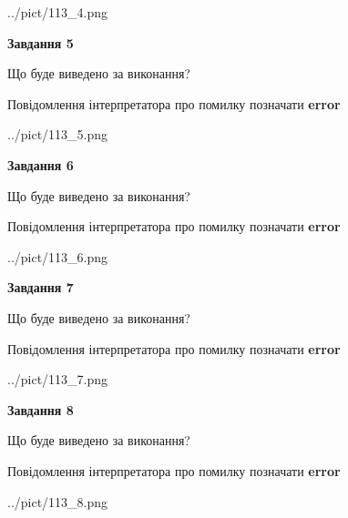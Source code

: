 \documentclass[12pt, ukrainian]{article}
\begin{document}
{\begin{center}
	{../pict/113_4.png}
\end{center}
\newpage

{\begin {center}\textbf{Завдання 5}\end {center}}\par
Що буде виведено за виконання? \par
Повідомлення інтерпретатора про помилку позначати \textbf{error}

\begin{center}
	{../pict/113_5.png}
\end{center}
\newpage

{\begin {center}\textbf{Завдання 6}\end {center}}\par
Що буде виведено за виконання? \par
Повідомлення інтерпретатора про помилку позначати \textbf{error}

\begin{center}
	{../pict/113_6.png}
\end{center}
\newpage

{\begin {center}\textbf{Завдання 7}\end {center}}\par
Що буде виведено за виконання? \par
Повідомлення інтерпретатора про помилку позначати \textbf{error}

\begin{center}
	{../pict/113_7.png}
\end{center}
\newpage

{\begin {center}\textbf{Завдання 8}\end {center}}\par
Що буде виведено за виконання? \par
Повідомлення інтерпретатора про помилку позначати \textbf{error}

\begin{center}
	{../pict/113_8.png}
\end{center}
\newpage

}
\end{document}
